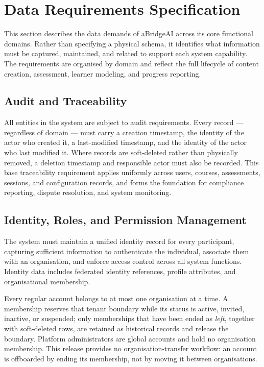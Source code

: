 ﻿\section{Data Requirements Specification}
\label{appendix:data}

This section describes the data demands of aBridgeAI across its core 
functional domains. Rather than specifying a physical schema, it 
identifies what information must be captured, maintained, and related 
to support each system capability. The requirements are organised by 
domain and reflect the full lifecycle of content creation, assessment, 
learner modeling, and progress reporting.

\subsection{Audit and Traceability}

All entities in the system are subject to audit requirements. Every 
record — regardless of domain — must carry a creation timestamp, the 
identity of the actor who created it, a last-modified timestamp, and 
the identity of the actor who last modified it. Where records are 
soft-deleted rather than physically removed, a deletion timestamp and 
responsible actor must also be recorded. This base traceability 
requirement applies uniformly across users, courses, assessments, 
sessions, and configuration records, and forms the foundation for 
compliance reporting, dispute resolution, and system monitoring.

\subsection{Identity, Roles, and Permission Management}
The system must maintain a unified identity record for every 
participant, capturing sufficient information to authenticate the 
individual, associate them with an organisation, and enforce
access control across all system functions. Identity data includes
federated identity references, profile attributes, and organisational
membership.

Every regular account belongs to at most one organisation at a time. A
membership reserves that tenant boundary while its status is active,
invited, inactive, or suspended; only memberships that have been ended
as \textit{left}, together with soft-deleted rows, are retained as
historical records and release the boundary. Platform administrators
are global accounts and hold no organisation membership. This release
provides no organisation-transfer workflow: an account is offboarded
by ending its membership, not by moving it between organisations.

